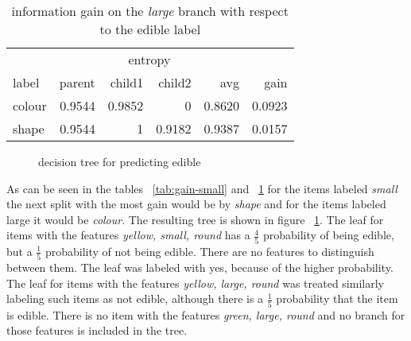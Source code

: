\documentclass[11pt]{article}
\begin{document}
\begin{enumerate}
\begin{table}[h]\footnotesize
\label{tab:gain-large}
\begin{tabular}{ l r r r r r }
& \multicolumn{4}{c}{entropy} & \\
\cline{2-5}
label & parent & child1 & child2 & avg & gain \\
\hline
colour & 0.9544 & 0.9852 & 0 & 0.8620 & 0.0923 \\
shape & 0.9544 & 1 & 0.9182 & 0.9387 & 0.0157 \\
\end{tabular}
\caption{information gain on the \emph{large} branch with respect to the edible label}
\end{table}

\begin{figure}
\label{fig:tree}
\caption{decision tree for predicting edible}
\end{figure}

As can be seen in the tables ~\ref{tab:gain-small} and ~\ref{tab:gain-large} for the items labeled \emph{small} the next split with the most gain would be by \emph{shape} and for the items labeled large it would be \emph{colour}. The resulting tree is shown in figure ~\ref{fig:tree}. The leaf for items with the features \emph{yellow,  small, round} has a $\frac{4}{5}$ probability of being edible, but a $\frac{1}{5}$ probability of not being edible. There are no features to distinguish between them. The leaf was labeled with yes, because of the higher probability. The leaf for items with the features \emph{yellow,  large, round} was treated similarly labeling such items as not edible, although there is a $\frac{1}{5}$ probability that the item is edible. There is no item with the features \emph{green, large, round} and no branch for those features is included in the tree.




\end{enumerate}
\end{document}
